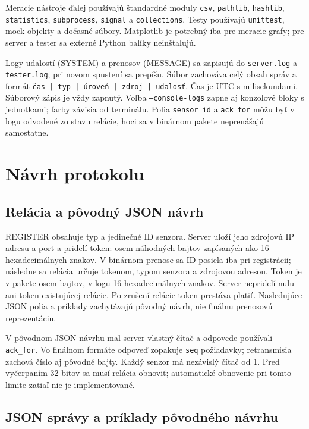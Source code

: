 \documentclass[12pt,a4paper]{article}
\begin{document}
Meracie nástroje ďalej používajú štandardné moduly \texttt{csv}, \texttt{pathlib}, \texttt{hashlib}, \texttt{statistics}, \texttt{subprocess}, \texttt{signal} a \texttt{collections}. Testy používajú \texttt{unittest}, mock objekty a dočasné súbory. Matplotlib je potrebný iba pre meracie grafy; pre server a tester sa externé Python balíky neinštalujú.

Logy udalostí (SYSTEM) a prenosov (MESSAGE) sa zapisujú do \texttt{server.log} a \texttt{tester.log}; pri novom spustení sa prepíšu. Súbor zachováva celý obsah správ a formát \texttt{čas | typ | úroveň | zdroj | udalosť}. Čas je UTC s milisekundami. Súborový zápis je vždy zapnutý. Voľba \texttt{--console-logs} zapne aj konzolové bloky s jednotkami; farby závisia od terminálu. Polia \texttt{sensor\_id} a \texttt{ack\_for} môžu byť v logu odvodené zo stavu relácie, hoci sa v binárnom pakete neprenášajú samostatne.

\section{Návrh protokolu}

\subsection{Relácia a pôvodný JSON návrh}

REGISTER obsahuje typ a jedinečné ID senzora. Server uloží jeho zdrojovú IP adresu a port a pridelí token: osem náhodných bajtov zapísaných ako 16 hexadecimálnych znakov. V binárnom prenose sa ID posiela iba pri registrácii; následne sa relácia určuje tokenom, typom senzora a zdrojovou adresou. Token je v pakete osem bajtov, v logu 16 hexadecimálnych znakov. Server nepridelí nulu ani token existujúcej relácie. Po zrušení relácie token prestáva platiť. Nasledujúce JSON polia a príklady zachytávajú pôvodný návrh, nie finálnu prenosovú reprezentáciu.

V pôvodnom JSON návrhu mal server vlastný čítač a odpovede používali \texttt{ack\_for}. Vo finálnom formáte odpoveď zopakuje \texttt{seq} požiadavky; retransmisia zachová číslo aj pôvodné bajty. Každý senzor má nezávislý čítač od 1. Pred vyčerpaním 32 bitov sa musí relácia obnoviť; automatické obnovenie pri tomto limite zatiaľ nie je implementované.

\subsection{JSON správy a príklady pôvodného návrhu}
\end{document}
